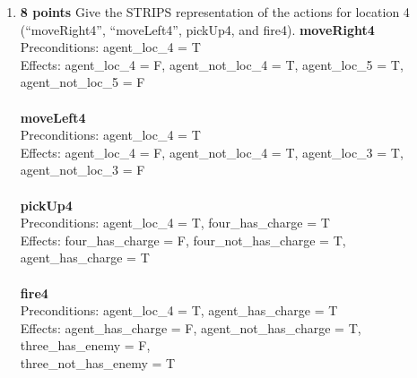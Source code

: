 \documentclass{article}
\def\ans#1{{\color{ans}#1}}
\begin{document}
\begin{enumerate}[label=(\alph*)]
{\begin{multicols}{2}
                nine\_has\_enemy \{T/F\} \\
                nine\_not\_has\_enemy \{T/F\} \\ \\
   		\end{multicols}
    } 
    \item \textbf{8 points} Give the STRIPS representation of the actions for location 4 (“moveRight4”, “moveLeft4”, pickUp4, and fire4). 
    \ans{
        \textbf{moveRight4}\\
        Preconditions:  agent\_loc\_4 = T\\
        Effects: agent\_loc\_4 = F,  agent\_not\_loc\_4 = T,   agent\_loc\_5 = T, 					agent\_not\_loc\_5 = F\\\\
        \textbf{moveLeft4}\\
        Preconditions:  agent\_loc\_4 = T \\
        Effects: agent\_loc\_4 = F,  agent\_not\_loc\_4 = T,   agent\_loc\_3 = T, 					agent\_not\_loc\_3 = F\\\\
        \textbf{pickUp4}\\
        Preconditions:  agent\_loc\_4 = T, four\_has\_charge = T\\
        Effects: four\_has\_charge = F, four\_not\_has\_charge = T, 				   						agent\_has\_charge = T \\\\
        \textbf{fire4}\\
        Preconditions: agent\_loc\_4 = T, agent\_has\_charge = T \\
        Effects: agent\_has\_charge = F,  agent\_not\_has\_charge = T, 					  				three\_has\_enemy = F,\\ three\_not\_has\_enemy = T	 \\\\
    }  \\


\end{enumerate}
\end{document}
